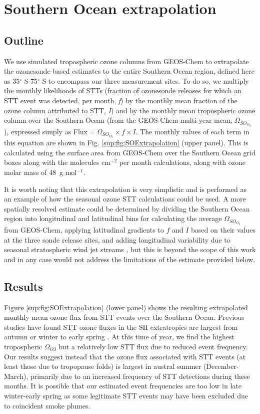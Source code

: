 \section{Southern Ocean extrapolation}
  \label{sup:sec:SOExtrapolation}

  \subsection{Outline}
    We use simulated tropospheric ozone columns from GEOS-Chem to extrapolate the ozonesonde-based estimates to the entire Southern Ocean region, defined here as 35$^{\circ}$ S-75$^{\circ}$ S to encompass our three measurement sites. 
    To do so, we multiply the monthly likelihoods of STTs (fraction of ozonesonde releases for which an STT event was detected, per month, \textit{f}) by the monthly mean fraction of the ozone column attributed to STT, \textit{I}) and by the monthly mean tropospheric ozone column over the Southern Ocean (from the GEOS-Chem multi-year mean, $\Omega_{SO_{O_3}}$), expressed simply as Flux$= \Omega_{SO_{O_3}} \times f \times I$.
    The monthly values of each term in this equation are shown in Fig. \ref{sup:fig:SOExtrapolation} (upper panel).
    This is calculated using the surface area from GEOS-Chem over the Southern Ocean grid boxes along with the molecules cm$^{-2}$ per month calculations, along with ozone molar mass of 48~g mol$^{-1}$.
    
    It is worth noting that this extrapolation is very simplistic and is performed as an example of how the seasonal ozone STT calculations could be used.
    A more spatially resolved estimate could be determined by dividing the Southern Ocean region into longitudinal and latitudinal bins for calculating the average $\Omega_{SO_{O_3}}$ from GEOS-Chem, applying latitudinal gradients to $f$ and $I$ based on their values at the three sonde release sites, and adding longitudinal variability due to seasonal stratospheric wind jet streams \citep{Baray2012,Skerlak2015}, but this is beyond the scope of this work and in any case would not address the limitations of the estimate provided below.

  \subsection{Results}
    
    Figure \ref{sup:fig:SOExtrapolation} (lower panel) shows the resulting extrapolated monthly mean ozone flux from STT events over the Southern Ocean.
    Previous studies have found STT ozone fluxes in the SH extratropics are largest from autumn or winter to early spring \citep{Olsen2003, Liu2016}.
    At this time of year, we find the highest tropospheric $\Omega_{O3}$ but a relatively low STT flux due to reduced event frequency.
    Our results suggest instead that the ozone flux associated with STT events (at least those due to tropopause folds) is largest in austral summer (December-March), primarily due to an increased frequency of STT detections during these months.
    It is possible that our estimated event frequencies are too low in late winter-early spring as some legitimate STT events may have been excluded due to coincident smoke plumes.
    
